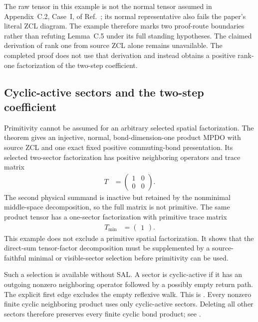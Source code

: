 \documentclass{article}
\begin{document}
The raw tensor in this example is not the normal tensor assumed in
Appendix~C.2, Case~I, of Ref.~\cite{Cirac2016MPDO_arXiv}; its normal
representative also fails the paper's literal ZCL diagram. The example
therefore marks two proof-route boundaries rather than refuting Lemma~C.5
under its full standing hypotheses. The claimed derivation of rank one from
source ZCL alone remains unavailable. The completed proof does not use that
derivation and instead obtains a positive rank-one factorization of the
two-step coefficient.

\subsection{Cyclic-active sectors and the two-step coefficient}

Primitivity cannot be assumed for an arbitrary selected spatial
factorization. The theorem
gives an injective, normal, bond-dimension-one product MPDO with source ZCL and
one exact fixed positive commuting-bond presentation. Its selected two-sector
factorization has positive neighboring operators and trace matrix
\begin{align}
    T
        &=
        \begin{pmatrix}
            1&0\\
            0&0
        \end{pmatrix}.
    \label{eq:cpsv16_commuting_form_to_sal_nonprimitive_selected_trace_matrix}
\end{align}
The second physical summand is inactive but retained by the nonminimal
middle-space decomposition, so the full matrix is not primitive. The same
product tensor has a one-sector factorization with primitive trace matrix
\begin{align}
    T_{\mathrm{min}}
        &=
        \begin{pmatrix}
            1
        \end{pmatrix}.
    \label{eq:cpsv16_commuting_form_to_sal_primitive_minimal_trace_matrix}
\end{align}
This example does not exclude a primitive spatial factorization. It shows that
the direct-sum tensor-factor decomposition must be supplemented by a
source-faithful minimal or visible-sector selection before primitivity can be
used.

Such a selection is available without SAL. A sector is cyclic-active if it has
an outgoing nonzero neighboring operator followed by a possibly empty return
path. The explicit first edge excludes the empty reflexive walk. This is
. Every
nonzero finite cyclic neighboring product uses only cyclic-active sectors.
Deleting all other sectors therefore preserves every finite cyclic bond
product; see
.
\end{document}
